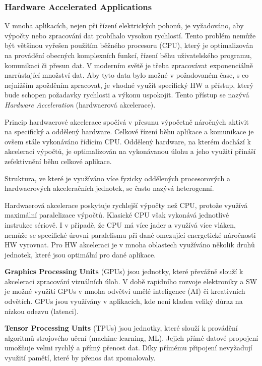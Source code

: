 \documentclass[a4paper, twoside, 11pt]{article}
\begin{document}
		\subsubsection{Hardware Accelerated Applications}\label{subsec:hardware-accelerated-applications}
		V mnoha aplikacích, nejen při řízení elektrických pohonů, je vyžadováno, aby výpočty nebo zpracování dat probíhalo vysokou rychlostí. Tento problém nemůže být většinou vyřešen použitím běžného procesoru (CPU), který je optimalizován na provádění obecných komplexních funkcí, řízení běhu uživatelského programu, komunikaci či přesun dat. V moderním světě je třeba zpracovávat exponenciálně narrůstající množství dat. Aby tyto data bylo možné v požadovaném čase, s co nejnižším zpožděním zpracovat, je vhodné využít specifický HW a přístup, který bude schopen požadavky rychlosti a výkonu uspokojit. Tento přístup se nazývá \textit{Hardware Acceleration} (hardwaerová akcelerace). \cite{xilinx-accelerated-computing}\par
		Princip hardwaerové akcelerace spočívá v přesunu výpočetně náročných aktivit na specifický a oddělený hardware. Celkové řízení běhu aplikace a komunikace je ovšem stále vykonáváno řídícím CPU. Oddělený hardware, na kterém dochází k akceleraci výpočtů, je optimalizován na vykonávanou úlohu a jeho využití přináší zefektivnění běhu celkové aplikace. \cite{xilinx-accelerated-computing}\par
		Struktura, ve které je využíváno více fyzicky oddělených procesorových a hardwaerových akceleračních jednotek, se často nazývá heterogenní. \cite{xilinx-accelerated-computing}\par
		Hardwaerová akcelerace poskytuje rychlejší výpočty než CPU, protože využívá maximální paralelizace výpočtů. Klasické CPU však vykonává jednotlivé instrukce sériově. I v případě, že CPU má více jader a využívá více vláken, nemůže se specifické úrovni paralelismu při dané omezující energetické náročnosti HW vyrovnat.
		Pro HW akceleraci je v mnoha oblastech využíváno několik druhů jednotek, které jsou optimální pro dané aplikace.\par
		\textbf{Graphics Processing Units} (GPUs) jsou jednotky, které převážně slouží k akceleraci zpracování vizuálních úloh. V době rapidního rozvoje elektroniky a SW je možné využití GPUs v mnoha odvětví umělé inteligence (AI) či kreativních odvětích. GPUs jsou využívány v aplikacích, kde není kladen veliký důraz na nízkou odezvu (latenci). \cite{xilinx-accelerated-computing}\par
		\textbf{Tensor Processing Units} (TPUs) jsou jednotky, které slouží k provádění algoritmů strojového učení (machine-learning, ML). Jejich přímé datové propojení umožňuje velmi rychlý a přímý přenost dat. Díky přímému připojení nevyžadují využití pamětí, které by přenos dat zpomalovaly. \cite{xilinx-accelerated-computing}\par
\end{document}
